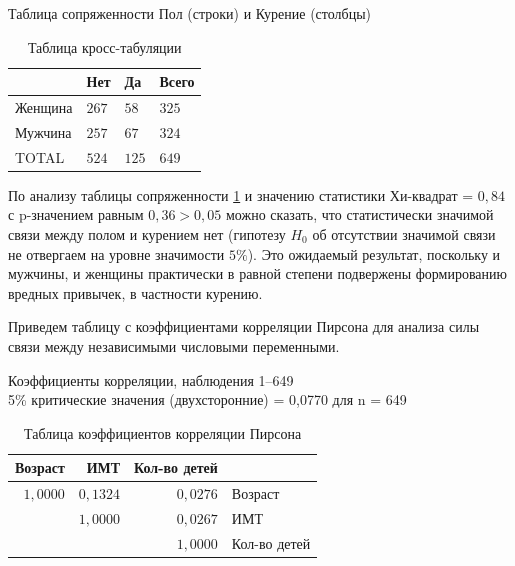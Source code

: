 \documentclass[a4paper,12pt]{article}
\begin{document}
\begin{table}[H]
	\begin{center}
		Таблица сопряженности Пол (строки) и Курение (столбцы)\\
		
		\vspace{8pt}
		
		\begin{tabular}{|l|l|l|l|}
			\hline
		    & Нет & Да & Всего \\[1ex]
		    \hline
			Женщина & $267$ & $58$ & $325$\\
			\hline
			Мужчина & $257$ & $67$ & $324$\\[1ex]
			\hline
			TOTAL & $524$ & $125$ & $649$\\
			\hline
		\end{tabular}
		\caption{Таблица кросс-табуляции}
		\label{tab:cross}
	\end{center}
\end{table}

По анализу таблицы сопряженности \ref{tab:cross} и значению статистики Хи-квадрат = $0,84$ с p-значением равным $0,36 > 0,05$ можно сказать, что статистически значимой связи между полом и курением нет (гипотезу $H_0$ об отсутствии значимой связи не отвергаем на уровне значимости $5\%$). Это ожидаемый результат, поскольку и мужчины, и женщины практически в равной степени подвержены формированию вредных привычек, в частности курению.

Приведем таблицу с коэффициентами корреляции Пирсона для анализа силы связи между независимыми числовыми переменными. 

\begin{table}[H]
\begin{center}
	Коэффициенты корреляции, наблюдения 1--649\\
	5\% критические значения (двухсторонние) = 0,0770 для n = 649\\
	\vspace{8pt}
	\begin{tabular}{|r|r|r|l|}
		\hline
		Возраст & ИМТ & Кол-во детей &\\
		\hline
		$1,0000$ & $0,1324$ & $0,0276$ & Возраст\\
		\hline
		& $1,0000$ & $0,0267$ & ИМТ\\
		\hline
		&  & $1,0000$ & Кол-во детей\\
		\hline
	\end{tabular}
	\caption{Таблица коэффициентов корреляции Пирсона}
	\label{tab:pris}
\end{center}
\end{table}
\end{document}
